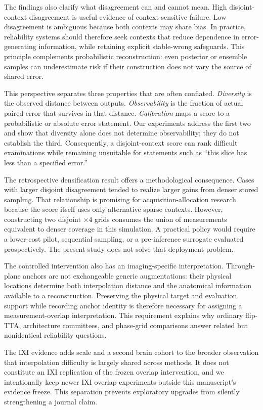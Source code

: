 \documentclass[journal,10pt]{IEEEtran}
\begin{document}
The findings also clarify what disagreement can and cannot mean. High disjoint-context disagreement is useful evidence of context-sensitive failure. Low disagreement is ambiguous because both contexts may share bias. In practice, reliability systems should therefore seek contexts that reduce dependence in error-generating information, while retaining explicit stable-wrong safeguards. This principle complements probabilistic reconstruction: even posterior or ensemble samples can underestimate risk if their construction does not vary the source of shared error.

This perspective separates three properties that are often conflated. \emph{Diversity} is the observed distance between outputs. \emph{Observability} is the fraction of actual paired error that survives in that distance. \emph{Calibration} maps a score to a probabilistic or absolute error statement. Our experiments address the first two and show that diversity alone does not determine observability; they do not establish the third. Consequently, a disjoint-context score can rank difficult examinations while remaining unsuitable for statements such as ``this slice has less than a specified error.''

The retrospective densification result offers a methodological consequence. Cases with larger disjoint disagreement tended to realize larger gains from denser stored sampling. That relationship is promising for acquisition-allocation research because the score itself uses only alternative sparse contexts. However, constructing two disjoint $\times4$ grids consumes the union of measurements equivalent to denser coverage in this simulation. A practical policy would require a lower-cost pilot, sequential sampling, or a pre-inference surrogate evaluated prospectively. The present study does not solve that deployment problem.

The controlled intervention also has an imaging-specific interpretation. Through-plane anchors are not exchangeable generic augmentations: their physical locations determine both interpolation distance and the anatomical information available to a reconstruction. Preserving the physical target and evaluation support while recording anchor identity is therefore necessary for assigning a measurement-overlap interpretation. This requirement explains why ordinary flip-TTA, architecture committees, and phase-grid comparisons answer related but nonidentical reliability questions.

The IXI evidence adds scale and a second brain cohort to the broader observation that interpolation difficulty is largely shared across methods. It does not constitute an IXI replication of the frozen overlap intervention, and we intentionally keep newer IXI overlap experiments outside this manuscript's evidence freeze. This separation prevents exploratory upgrades from silently strengthening a journal claim.
\end{document}
